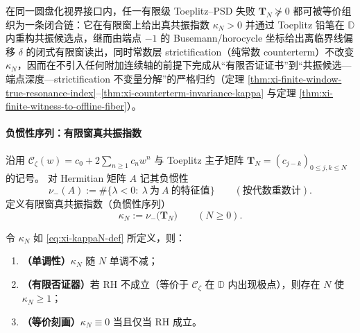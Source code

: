 

\begin{theorem}\label{thm:xi-toeplitz-failure-closed-chain}
在同一圆盘化视界接口内，任一有限级 Toeplitz--PSD 失败 \(\mathbf{T}_N\nsucceq 0\) 都可被等价组织为一条闭合链：它在有限窗上给出真共振指数 \(\kappa_N>0\) 并通过 Toeplitz 铅笔在 \(\mathbb{D}\) 内重构共振候选点，继而由端点 \(-1\) 的 Busemann/horocycle 坐标给出离临界线偏移 \(\delta\) 的闭式有限窗读出，同时常数层 strictification（纯常数 counterterm）不改变 \(\kappa_N\)，因而在不引入任何附加连续轴的前提下完成从“有限否证证书”到“共振候选—端点深度—strictification 不变量分解”的严格归约（定理 \ref{thm:xi-finite-window-true-resonance-index}--\ref{thm:xi-counterterm-invariance-kappa} 与定理 \ref{thm:xi-finite-witness-to-offline-fiber}）。
\end{theorem}

\paragraph{负惯性序列：有限窗真共振指数}
沿用 \(\mathscr{C}_{\zeta}(w)=c_0+2\sum_{n\ge 1}c_n w^n\) 与 Toeplitz 主子矩阵 \(\mathbf{T}_N=(c_{j-k})_{0\le j,k\le N}\) 的记号。
对 Hermitian 矩阵 \(A\) 记其负惯性
\[
\nu_-(A):=\#\{\lambda<0:\ \lambda\ \text{为}\ A\ \text{的特征值}\}\qquad(\text{按代数重数计}).
\]
定义有限窗真共振指数（负惯性序列）
\begin{equation}\label{eq:xi-kappaN-def}
\boxed{\ \kappa_N:=\nu_-\!\bigl(\mathbf{T}_N\bigr)\qquad(N\ge 0).\ }
\end{equation}

\begin{theorem}\label{thm:xi-finite-window-true-resonance-index}
令 \(\kappa_N\) 如 \eqref{eq:xi-kappaN-def} 所定义，则：
\begin{enumerate}
  \item \textbf{（单调性）}\(\kappa_N\) 随 \(N\) 单调不减；
  \item \textbf{（有限否证器）}若 RH 不成立（等价于 \(\mathscr{C}_{\zeta}\) 在 \(\mathbb{D}\) 内出现极点），则存在 \(N\) 使 \(\kappa_N\ge 1\)；
  \item \textbf{（等价刻画）}\(\kappa_N\equiv 0\) 当且仅当 RH 成立。
\end{enumerate}
\end{theorem}


